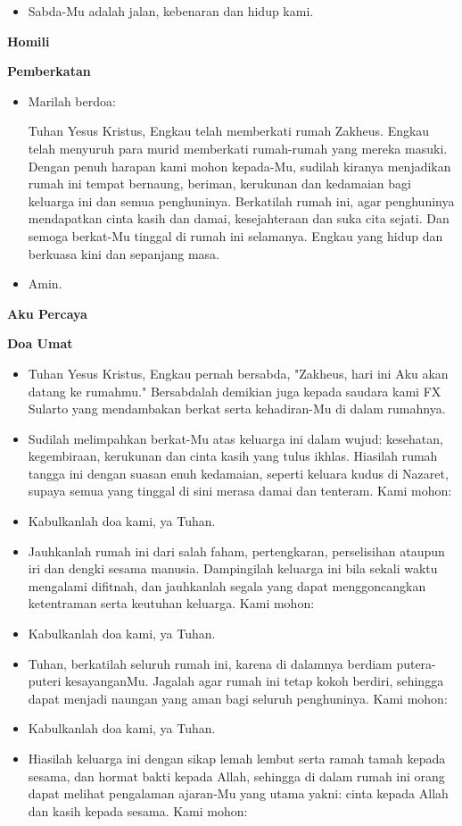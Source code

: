 \documentclass[12pt]{book}
\makeatletter
\newcommand{\subjudul}[1]{%
  {\parindent \z@ \normalfont
    \interlinepenalty\@M \bfseries #1\par\nobreak \vskip 20\p@ }}
\newcommand{\BU}[1]{\begin{itemize} \item[U:] #1 \end{itemize}}
\newcommand{\BI}[1]{\begin{itemize} \item[I:] #1 \end{itemize}}
\newcommand{\BP}[1]{\begin{itemize} \item[P:] #1 \end{itemize}}
\newcommand{\keluarga}{FX Sularto }
\makeatother
\begin{document}
\BU{Sabda-Mu adalah jalan, kebenaran dan hidup kami.}

\subjudul{Homili}

\subjudul{Pemberkatan}
\BI{Marilah berdoa:

Tuhan Yesus Kristus, Engkau telah memberkati rumah Zakheus. Engkau telah menyuruh para murid memberkati rumah-rumah yang mereka masuki. Dengan penuh harapan kami mohon kepada-Mu, sudilah kiranya menjadikan rumah ini tempat bernaung, beriman, kerukunan dan kedamaian bagi keluarga ini dan semua penghuninya. Berkatilah rumah ini, agar penghuninya mendapatkan cinta kasih dan damai, kesejahteraan dan suka cita sejati. Dan semoga berkat-Mu tinggal di rumah ini selamanya. Engkau yang hidup dan berkuasa kini dan sepanjang masa.}

\BU{Amin.}



\subjudul{Aku Percaya}

\subjudul{Doa Umat}

\BI{Tuhan Yesus Kristus, Engkau pernah bersabda, "Zakheus, hari ini Aku akan datang ke rumahmu." Bersabdalah demikian juga kepada saudara kami \keluarga yang mendambakan berkat serta kehadiran-Mu di dalam rumahnya.}

\BP{Sudilah melimpahkan berkat-Mu atas keluarga ini dalam wujud: kesehatan, kegembiraan, kerukunan dan cinta kasih yang tulus ikhlas. Hiasilah rumah tangga ini dengan suasan enuh kedamaian, seperti keluara kudus di Nazaret, supaya semua yang tinggal di sini merasa damai dan tenteram. Kami mohon:}

\BU{Kabulkanlah doa kami, ya Tuhan.}

\BP{Jauhkanlah rumah ini dari salah faham, pertengkaran, perselisihan ataupun iri dan dengki sesama manusia. Dampingilah keluarga ini bila sekali waktu mengalami difitnah, dan jauhkanlah segala yang dapat menggoncangkan ketentraman serta keutuhan keluarga. Kami mohon:}

\BU{Kabulkanlah doa kami, ya Tuhan.}

\BP{Tuhan, berkatilah seluruh rumah ini, karena di dalamnya berdiam putera-puteri kesayanganMu. Jagalah agar rumah ini tetap kokoh berdiri, sehingga dapat menjadi naungan yang aman bagi seluruh penghuninya. Kami mohon:} 

\BU{Kabulkanlah doa kami, ya Tuhan.}

\BP{Hiasilah keluarga ini dengan sikap lemah lembut serta ramah tamah kepada sesama, dan hormat bakti kepada Allah, sehingga di dalam rumah ini orang dapat melihat pengalaman ajaran-Mu yang utama yakni: cinta kepada Allah dan kasih kepada sesama. Kami mohon:}
\end{document}
